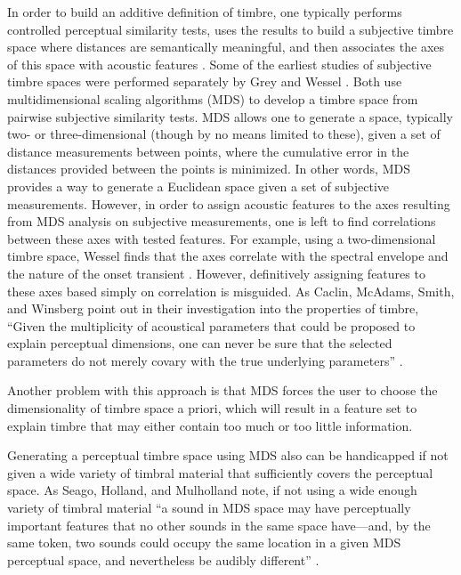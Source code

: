 \documentclass[a4paper,12pt]{report} 	%
\numberwithin{figure}{chapter}
\numberwithin{table}{chapter}
\numberwithin{equation}{chapter}
\begin{document}
\begin{flushleft}
In order to build an additive definition of timbre, one typically performs controlled perceptual similarity tests, uses the results to build a subjective timbre space where distances are semantically meaningful, and then associates the axes of this space with acoustic features \cite[p. 1]{Pampalk:2008xz}. Some of the earliest studies of subjective timbre spaces were performed separately by Grey and Wessel \cite{Grey:NoRead, Wessel:1979tg}. Both use multidimensional scaling algorithms (MDS) to develop a timbre space from pairwise subjective similarity tests. MDS allows one to generate a space, typically two- or three-dimensional (though by no means limited to these), given a set of distance measurements between points, where the cumulative error in the distances provided between the points is minimized. In other words, MDS provides a way to generate a Euclidean space given a set of subjective measurements. However, in order to assign acoustic features to the axes resulting from MDS analysis on subjective measurements, one is left to find correlations between these axes with tested features. For example, using a two-dimensional timbre space, Wessel finds that the axes correlate with the spectral envelope and the nature of the onset transient \cite[p. 48]{Wessel:1979tg}. However, definitively assigning features to these axes based simply on correlation is misguided. As Caclin, McAdams, Smith, and Winsberg point out in their investigation into the properties of timbre, ``Given the multiplicity of acoustical parameters that could be proposed to explain perceptual dimensions, one can never be sure that the selected parameters do not merely covary with the true underlying parameters'' \cite[p. 2]{Caclin:2005il}. 

Another problem with this approach is that MDS forces the user to choose the dimensionality of timbre space a priori, which will result in a feature set to explain timbre that may either contain too much or too little information.

Generating a perceptual timbre space using MDS also can be handicapped if not given a wide variety of timbral material that sufficiently covers the perceptual space. As Seago, Holland, and Mulholland note, if not using a wide enough variety of timbral material ``a sound in MDS space may have perceptually important features that no other sounds in the same space have---and, by the same token, two sounds could occupy the same location in a given MDS perceptual space, and nevertheless be audibly different'' \cite[p. 3]{Seago:2008ya}.


\end{flushleft}
\end{document}
